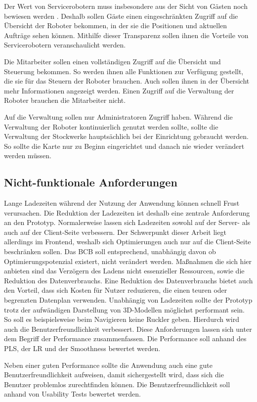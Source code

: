 Der Wert von Servicerobotern muss insbesondere aus der Sicht von Gästen noch bewiesen werden \cite[S.~429]{Paluch2020}. Deshalb sollen Gäste einen eingeschränkten Zugriff auf die Übersicht der Roboter bekommen, in der sie die Positionen und aktuellen Aufträge sehen können. Mithilfe dieser Transparenz sollen ihnen die Vorteile von Servicerobotern veranschaulicht werden.

Die Mitarbeiter sollen einen vollständigen Zugriff auf die Übersicht und Steuerung bekommen. So werden ihnen alle Funktionen zur Verfügung gestellt, die sie für das Steuern der Roboter brauchen. Auch sollen ihnen in der Übersicht mehr Informationen angezeigt werden. Einen Zugriff auf die Verwaltung der Roboter brauchen die Mitarbeiter nicht.

Auf die Verwaltung sollen nur Administratoren Zugriff haben. Während die Verwaltung der Roboter kontinuierlich genutzt werden sollte, sollte die Verwaltung der Stockwerke hauptsächlich bei der Einrichtung gebraucht werden. So sollte die Karte nur zu Beginn eingerichtet und danach nie wieder verändert werden müssen.

\subsection{Nicht-funktionale Anforderungen}
Lange Ladezeiten während der Nutzung der Anwendung können schnell Frust verursachen. Die Reduktion der Ladezeiten ist deshalb eine zentrale Anforderung an den Prototyp. Normalerweise lassen sich Ladezeiten sowohl auf der Server- als auch auf der Client-Seite verbessern. Der Schwerpunkt dieser Arbeit liegt allerdings im Frontend, weshalb sich Optimierungen auch nur auf die Client-Seite beschränken sollen. Das \ac{BCB} soll entsprechend, unabhängig davon ob Optimierungspotenzial existert, nicht verändert werden. Maßnahmen die sich hier anbieten sind das Verzögern des Ladens nicht essenzieller Ressourcen, sowie die Reduktion des Datenverbrauchs. Eine Reduktion des Datenverbrauchs bietet auch den Vorteil, dass sich Kosten für Nutzer reduzieren, die einen teuren oder begrenzten Datenplan verwenden. Unabhängig von Ladezeiten sollte der Prototyp trotz der aufwändigen Darstellung von 3D-Modellen möglichst performant sein. So soll es beispielsweise beim Navigieren keine Ruckler geben. Hierdurch wird auch die Benutzerfreundlichkeit verbessert. Diese Anforderungen lassen sich unter dem Begriff der Performance zusammenfassen. Die Performance soll anhand des \ac{PLS}, der \ac{LR} und der Smoothness bewertet werden.

Neben einer guten Performance sollte die Anwendung auch eine gute Benutzerfreundlichkeit aufweisen, damit sichergestellt wird, dass sich die Benutzer problemlos zurechtfinden können. Die Benutzerfreundlichkeit soll anhand von Usability Tests bewertet werden.
